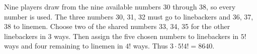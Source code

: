 Nine players draw from the nine available numbers 30 through 38, so every number is used. The three numbers 30, 31, 32 must go to linebackers and 36, 37, 38 to linemen. Choose two of the shared numbers 33, 34, 35 for the other linebackers in 3 ways. Then assign the five chosen numbers to linebackers in $ 5!$ ways and four remaining to linemen in $ 4!$ ways. Thus $\boxed{3\cdot5!4!=8640}$.
